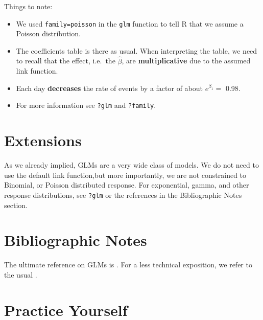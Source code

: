 \documentclass[]{book}
\providecommand{\tightlist}{%
  \setlength{\itemsep}{0pt}\setlength{\parskip}{0pt}}
\theoremstyle{definition}
\theoremstyle{definition}
\theoremstyle{definition}
\theoremstyle{remark}
\begin{document}
Things to note:

\begin{itemize}
\tightlist
\item
  We used \texttt{family=poisson} in the \texttt{glm} function to tell R that we assume a Poisson distribution.
\item
  The coefficients table is there as usual.
  When interpreting the table, we need to recall that the effect, i.e.~the \(\hat \beta\), are \textbf{multiplicative} due to the assumed link function.
\item
  Each day \textbf{decreases} the rate of events by a factor of about \(e^{\beta_1}=\) 0.98.
\item
  For more information see \texttt{?glm} and \texttt{?family}.
\end{itemize}

\hypertarget{extensions}{%
\section{Extensions}\label{extensions}}

As we already implied, GLMs are a very wide class of models.
We do not need to use the default link function,but more importantly, we are not constrained to Binomial, or Poisson distributed response.
For exponential, gamma, and other response distributions, see \texttt{?glm} or the references in the Bibliographic Notes section.

\hypertarget{bibliographic-notes-5}{%
\section{Bibliographic Notes}\label{bibliographic-notes-5}}

The ultimate reference on GLMs is \citet{mccullagh1984generalized}.
For a less technical exposition, we refer to the usual \citet{venables2013modern}.

\hypertarget{practice-glm}{%
\section{Practice Yourself}\label{practice-glm}}
\end{document}
